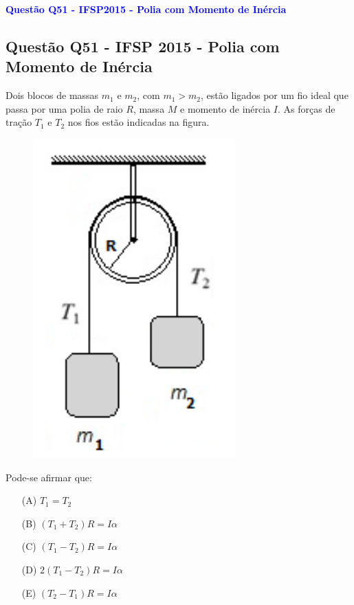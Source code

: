 \begin{flushleft}
\textbf{\textcolor{blue}{\Large Quest\~ao Q51 - IFSP2015 - Polia com Momento de Inércia}}\\
\noindent

\subsection{Quest\~ao Q51 - IFSP 2015 - Polia com Momento de Inércia}

Dois blocos de massas \( m_1 \) e \( m_2 \), com \( m_1 > m_2 \), estão ligados por um fio ideal que passa por uma polia de raio \( R \), massa \( M \) e momento de inércia \( I \). As forças de tração \( T_1 \) e \( T_2 \) nos fios estão indicadas na figura.

\begin{figure}[!h]
\centering
\includegraphics[scale=0.5]{figures/polia_com_massa.png}
\end{figure}

Pode-se afirmar que:

\begin{itemize}
\item[(A)] \( T_1 = T_2 \)
\item[(B)] \( (T_1 + T_2)R = I\alpha \)
\item[(C)] \( (T_1 - T_2)R = I\alpha \)
\item[(D)] \( 2(T_1 - T_2)R = I\alpha \)
\item[(E)] \( (T_2 - T_1)R = I\alpha \)
\end{itemize}


\end{flushleft}
